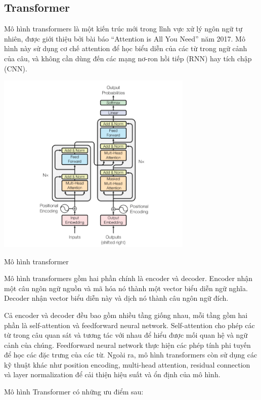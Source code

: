 \subsection{Transformer}

Mô hình transformers là một kiến trúc mới trong lĩnh vực xử lý ngôn ngữ tự nhiên, được giới thiệu bởi bài báo “Attention is All You Need” năm 2017. Mô hình này sử dụng cơ chế attention để học biểu diễn của các từ trong ngữ cảnh của câu, và không cần dùng đến các mạng nơ-ron hồi tiếp (RNN) hay tích chập (CNN). 

\begin{minipage}{\linewidth}
    \captionsetup{type=figure}
    \centering
    \includegraphics[width=0.7\textwidth]{images/transformer.png}
    \caption{Mô hình transformer}
\end{minipage}

Mô hình transformers gồm hai phần chính là encoder và decoder. Encoder nhận một câu ngôn ngữ nguồn và mã hóa nó thành một vector biểu diễn ngữ nghĩa. Decoder nhận vector biểu diễn này và dịch nó thành câu ngôn ngữ đích.

Cả encoder và decoder đều bao gồm nhiều tầng giống nhau, mỗi tầng gồm hai phần là self-attention và feedforward neural network. Self-attention cho phép các từ trong câu quan sát và tương tác với nhau để hiểu được mối quan hệ và ngữ cảnh của chúng. Feedforward neural network thực hiện các phép tính phi tuyến để học các đặc trưng của các từ. Ngoài ra, mô hình transformers còn sử dụng các kỹ thuật khác như position encoding, multi-head attention, residual connection và layer normalization để cải thiện hiệu suất và ổn định của mô hình.

Mô hình Transformer có những ưu điểm sau:

